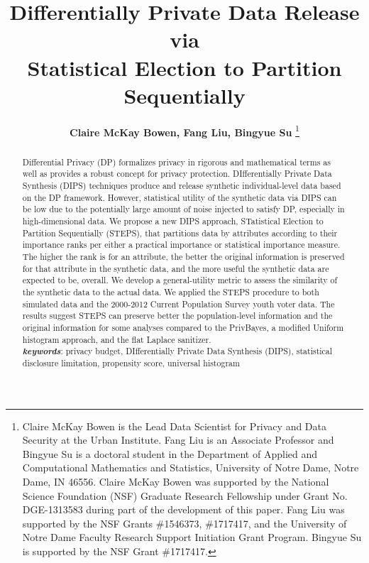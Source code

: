\documentclass[12pt, A4]{article}
\theoremstyle{plain}
\theoremstyle{exampstyle}\newtheorem{defn}{Definition}
\theoremstyle{exampstyle}\newtheorem{lem}{Lemma}
\theoremstyle{exampstyle}\newtheorem{cor}{Corollary}
\theoremstyle{exampstyle}\newtheorem{pro}{Proposition}
\theoremstyle{exampstyle}\newtheorem{cla}{Claim}
\theoremstyle{exampstyle}\newtheorem{rem}{Remark}
\begin{document}
\title{\large{\textbf{Differentially Private Data Release via\\ Statistical Election to Partition Sequentially}}}
\author{\small{\textbf{Claire McKay Bowen, Fang Liu, Bingyue Su}}
\footnote{\noindent Claire McKay Bowen is the Lead Data Scientist for Privacy and Data Security at the Urban Institute. Fang Liu is an Associate Professor and Bingyue Su is a doctoral student in the Department of Applied and Computational Mathematics and Statistics, University of Notre Dame, Notre Dame, IN 46556. Claire McKay Bowen was supported by the National Science Foundation (NSF) Graduate Research Fellowship under Grant No. DGE-1313583 during part of the development of this paper. Fang Liu was supported by the NSF Grants  \#1546373, \#1717417, and the University of Notre Dame Faculty Research Support Initiation Grant Program. Bingyue Su is supported by the NSF Grant \#1717417.} 
\vspace{-3.5cm}
}
\date{}
\maketitle{}

\begin{abstract}
\noindent Differential Privacy (DP) formalizes privacy in rigorous and mathematical terms as well as provides a robust concept for privacy protection. DIfferentially Private Data Synthesis (DIPS) techniques produce and release synthetic individual-level data based on the DP framework. However, statistical utility of the synthetic data via DIPS can be low due to the potentially large amount of noise injected to satisfy DP, especially in high-dimensional data. We propose a new DIPS approach, STatistical Election to Partition Sequentially (STEPS), that partitions data by attributes according to their importance ranks per either a practical importance or statistical importance measure. The higher the rank is for an attribute, the better the original information is preserved for that attribute in the synthetic data, and the more useful the synthetic data are expected to be, overall. We develop a general-utility metric to assess the similarity of the synthetic data to the actual data. We applied the STEPS procedure to both simulated data and the 2000-2012 Current Population Survey youth voter data. The results suggest STEPS can preserve better the population-level information and the original information for some analyses compared to the PrivBayes, a modified Uniform histogram approach, and the flat Laplace sanitizer.\\

\noindent \textit{\textbf{keywords}}:  privacy budget, DIfferentially Private Data Synthesis (DIPS), statistical disclosure limitation, propensity score, universal histogram
\end{abstract}
\end{document}
